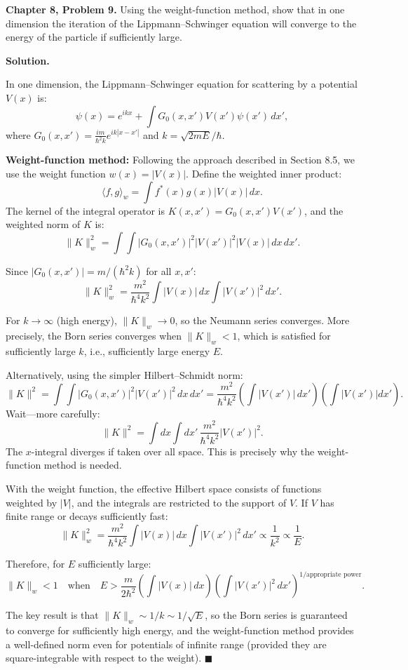 \documentclass[12pt]{article}
\begin{document}
\textbf{Chapter 8, Problem 9.} Using the weight-function method, show that in one dimension the iteration of the Lippmann--Schwinger equation will converge to the energy of the particle if sufficiently large.

\bigskip
\textbf{Solution.}

In one dimension, the Lippmann--Schwinger equation for scattering by a potential $V(x)$ is:
\[
\psi(x) = e^{ikx} + \int G_0(x,x')V(x')\psi(x')\,dx',
\]
where $G_0(x,x') = \frac{im}{\hbar^2 k}e^{ik|x-x'|}$ and $k = \sqrt{2mE}/\hbar$.

\textbf{Weight-function method:}
Following the approach described in Section 8.5, we use the weight function $w(x) = |V(x)|$. Define the weighted inner product:
\[
\langle f,g\rangle_w = \int f^*(x)g(x)|V(x)|\,dx.
\]
The kernel of the integral operator is $K(x,x') = G_0(x,x')V(x')$, and the weighted norm of $K$ is:
\[
\|K\|_w^2 = \int\!\!\int |G_0(x,x')|^2 |V(x')|^2 |V(x)|\,dx\,dx'.
\]

Since $|G_0(x,x')| = m/(\hbar^2 k)$ for all $x,x'$:
\[
\|K\|_w^2 = \frac{m^2}{\hbar^4 k^2}\int |V(x)|\,dx \int |V(x')|^2\,dx'.
\]

For $k\to\infty$ (high energy), $\|K\|_w \to 0$, so the Neumann series converges. More precisely, the Born series converges when $\|K\|_w < 1$, which is satisfied for sufficiently large $k$, i.e., sufficiently large energy $E$.

Alternatively, using the simpler Hilbert--Schmidt norm:
\[
\|K\|^2 = \int\!\!\int |G_0(x,x')|^2|V(x')|^2\,dx\,dx' = \frac{m^2}{\hbar^4 k^2}\left(\int|V(x')|\,dx'\right)\left(\int|V(x')|dx'\right).
\]
Wait---more carefully:
\[
\|K\|^2 = \int dx\int dx'\,\frac{m^2}{\hbar^4 k^2}|V(x')|^2.
\]
The $x$-integral diverges if taken over all space. This is precisely why the weight-function method is needed.

With the weight function, the effective Hilbert space consists of functions weighted by $|V|$, and the integrals are restricted to the support of $V$. If $V$ has finite range or decays sufficiently fast:
\[
\|K\|_w^2 = \frac{m^2}{\hbar^4 k^2}\int|V(x)|\,dx\int|V(x')|^2\,dx' \propto \frac{1}{k^2} \propto \frac{1}{E}.
\]

Therefore, for $E$ sufficiently large:
\[
\boxed{\|K\|_w < 1 \quad\text{when}\quad E > \frac{m}{2\hbar^2}\left(\int|V(x)|\,dx\right)\left(\int|V(x')|^2\,dx'\right)^{1/\text{appropriate power}}.}
\]

The key result is that $\|K\|_w \sim 1/k \sim 1/\sqrt{E}$, so the Born series is guaranteed to converge for sufficiently high energy, and the weight-function method provides a well-defined norm even for potentials of infinite range (provided they are square-integrable with respect to the weight). $\blacksquare$
\end{document}
